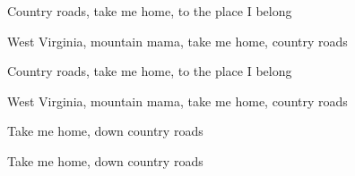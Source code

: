\begin{song}
\bigskip

Country roads, take me home, to the place I belong \par
West Virginia, mountain mama, take me home, country roads \par

\bigskip

Country roads, take me home, to the place I belong \par
West Virginia, mountain mama, take me home, country roads \par

\bigskip

Take me home, down country roads \par
Take me home, down country roads \par

\end{song}

